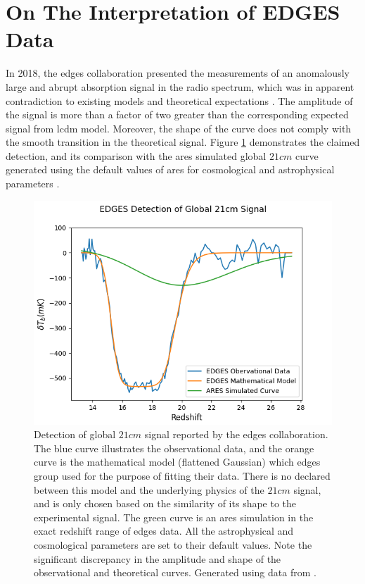 \documentclass[12pt, TexShade, letterpaper]{report}
\begin{document}
\section{On The Interpretation of EDGES Data}
\label{chap:Observations,sub:edges_affair}
 In 2018, the \gls{edges} collaboration presented the measurements of an anomalously large and abrupt absorption signal in the radio spectrum, which was in apparent contradiction to existing models and theoretical expectations \cite{edges}. The amplitude of the signal is more than a factor of two greater than the corresponding expected signal from \gls{lcdm} model. Moreover, the shape of the curve does not comply with the smooth transition in the theoretical signal. Figure \ref{fig:edges_data} demonstrates the claimed detection, and its comparison with the \gls{ares} simulated global $21cm$ curve generated using the default values of \gls{ares} for cosmological and astrophysical parameters \cite{ares_documentation}.\par
\begin{figure}[h!]
    \centering
    \includegraphics[scale= 0.8]{edges_data.png}
    \caption[Results of \gls{edges} Experiment]{Detection of global $21cm$ signal reported by the \gls{edges} collaboration. The blue curve illustrates the observational data, and the orange curve is the mathematical model (flattened Gaussian) which \gls{edges} group used for the purpose of fitting their data. There is no declared between this model and the underlying physics of the $21cm$ signal, and is only chosen based on the similarity of its shape to the experimental signal. The green curve is an \gls{ares} simulation in the exact redshift range of \gls{edges} data. All the astrophysical and cosmological parameters are set to their default values. Note the significant discrepancy in the amplitude and shape of the observational and theoretical curves. Generated using data from \cite{edges}.}
    \label{fig:edges_data}
\end{figure}
 
\end{document}

